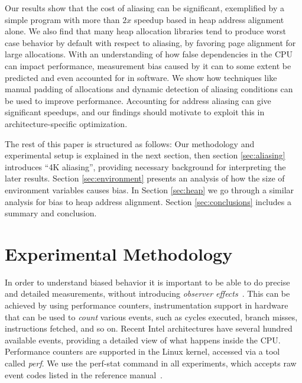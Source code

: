 \documentclass[prodmode,acmtaco]{acmsmall}
\begin{document}
Our results show that the cost of aliasing can be significant, exemplified by a simple program with more than $2x$ speedup based in heap address alignment alone.
We also find that many heap allocation libraries tend to produce worst case behavior by default with respect to aliasing, by favoring page alignment for large allocations.
With an understanding of how false dependencies in the CPU can impact performance, measurement bias caused by it can to some extent be predicted and even accounted for in software.
We show how techniques like manual padding of allocations and dynamic detection of aliasing conditions can be used to improve performance. 
Accounting for address aliasing can give significant speedups, and our findings should motivate to exploit this in architecture-specific optimization.

The rest of this paper is structured as follows: Our methodology and experimental setup is explained in the next section, then section \ref{sec:aliasing} introduces ``4K aliasing'', providing necessary background for interpreting the later results.
Section \ref{sec:environment} presents an analysis of how the size of environment variables causes bias.
In Section \ref{sec:heap} we go through a similar analysis for bias to heap address alignment.
Section \ref{sec:conclusions} includes a summary and conclusion.


\section{Experimental Methodology}
\label{sec:methodology}
In order to understand biased behavior it is important to be able to do precise and detailed measurements, without introducing \emph{observer effects}~\cite{Mytkowicz:2008:OE&MB}.
This can be achieved by using performance counters, instrumentation support in hardware that can be used to \emph{count} various events, such as cycles executed, branch misses, instructions fetched, and so on.
Recent Intel architectures have several hundred available events, providing a detailed view of what happens inside the CPU.
Performance counters are supported in the Linux kernel, accessed via a tool called \emph{perf}.
We use the perf-stat command in all experiments, which accepts raw event codes listed in the reference manual~\cite{Volume3B}.
\end{document}
